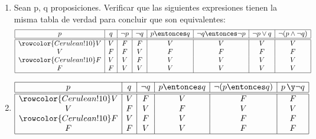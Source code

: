 \begin{enumerate}[label=\roman*)]
  \item
        Sean p, q proposiciones. Verificar que las siguientes expresiones tienen la misma tabla de verdad para
        concluir que son equivalentes:
        $$
          \begin{array}{|c|c|c|c|c|c|c|c|}
            \hline
            p & q & \neg p & \neg q & p \entonces q & \neg q \entonces \neg p & \neg p \lor q & \neg(p \land \neg q) \\ \hline  \hline\rowcolor{Cerulean!10}
            V & V & F      & F      & V             & V                       & V             & V                    \\
            V & F & F      & V      & F             & F                       & F             & F                    \\\rowcolor{Cerulean!10}
            F & V & V      & F      & V             & V                       & V             & V                    \\
            F & F & V      & V      & V             & V                       & V             & V                    \\
            \hline
          \end{array}
        $$
  \item
        $$
          \begin{array}{|c|c|c|c|c|c|}
            \hline
            p & q & \neg q & p \entonces q & \neg (p \entonces q) & p\, \y \neg q \\ \hline  \hline\rowcolor{Cerulean!10}
            V & V & F      & V             & F                    & F             \\
            V & F & V      & F             & V                    & V             \\\rowcolor{Cerulean!10}
            F & V & F      & V             & F                    & F             \\
            F & F & V      & V             & F                    & F             \\ \hline
          \end{array}
        $$
\end{enumerate}

\begin{aportes}
  \item {}
\end{aportes}

